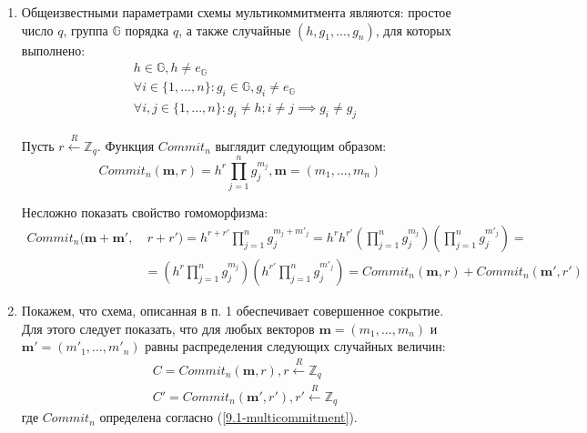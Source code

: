 \documentclass[12pt, a4paper]{extarticle}
\begin{document}
\begin{enumerate}
    \item Общеизвестными параметрами схемы мультикоммитмента являются: простое число $q$, группа 
    	$\mathbb{G}$ порядка $q$, а также случайные $(h, g_1, ..., g_n)$, для которых выполнено:
        \begin{equation*}
            \begin{split}
                & h \in \mathbb{G}, h \ne e_{\mathbb{G}} \\
                & \forall i \in \{1, ..., n\} : g_i \in \mathbb{G}, g_i \ne e_{\mathbb{G}} \\
                & \forall i, j \in \{1, ..., n\} : g_i \ne h; i \ne j \implies g_i \ne g_j
            \end{split}
        \end{equation*}
        
        Пусть $r \xleftarrow{R} \mathbb{Z}_q$. Функция $Commit_n$ выглядит следующим образом:
        \begin{equation}
            Commit_n(\mathbf{m}, r) = h^r \prod_{j = 1}^{n} g_j^{m_j}, \mathbf{m} = (m_1, ..., m_n)
            \label{9.1-multicommitment}
        \end{equation}
        
        Несложно показать свойство гомоморфизма:
        \begin{equation*}
            \begin{split}
                Commit_n(\mathbf{m} + \mathbf{m'}, &\ r + r') = h^{r + r'} \prod_{j = 1}^{n} 
                	g_j^{m_j + m'_j} = h^r h^{r'} \left(\prod_{j = 1}^{n} g_j^{m_j}\right) 
                	\left(\prod_{j = 1}^{n} g_j^{m'_j}\right) = \\
                & = \left(h^r \prod_{j = 1}^{n} g_j^{m_j}\right) \left(h^{r'} 
                	\prod_{j = 1}^{n} g_j^{m'_j}\right) = Commit_n(\mathbf{m}, r) +
                	Commit_n(\mathbf{m'}, r')
            \end{split}
        \end{equation*}
        
    \item Покажем, что схема, описанная в п. 1 обеспечивает совершенное сокрытие. Для этого следует 
    	показать, что для любых векторов $\mathbf{m} = (m_1, ..., m_n)$ и $\mathbf{m'} = (m'_1, ..., 
    	m'_n)$ равны распределения следующих случайных величин:
        \begin{equation*}
            \begin{split}
                & C  = Commit_n(\mathbf{m},  r),  r  \xleftarrow{R} \mathbb{Z}_q \\
                & C' = Commit_n(\mathbf{m'}, r'), r' \xleftarrow{R} \mathbb{Z}_q
            \end{split}
        \end{equation*}
        где $Commit_n$ определена согласно (\ref{9.1-multicommitment}).
        

\end{enumerate}
\end{document}
